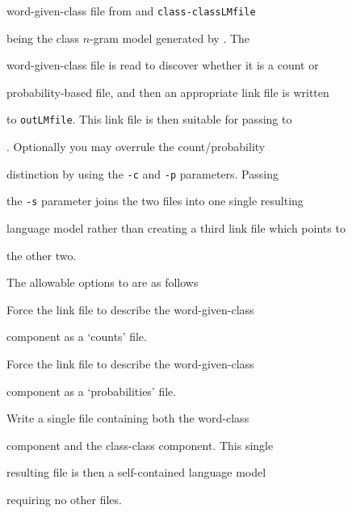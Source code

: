 word-given-class file from  and {\tt class-classLMfile}


being the class $n$-gram model generated by .  The


word-given-class file is read to discover whether it is a count or


probability-based file, and then an appropriate link file is written


to {\tt outLMfile}.  This link file is then suitable for passing to


.  Optionally you may overrule the count/probability


distinction by using the {\tt -c} and {\tt -p} parameters.  Passing


the {\tt -s} parameter joins the two files into one single resulting


language model rather than creating a third link file which points to


the other two.





The allowable options to  are as follows


\begin{optlist}


   Force the link file to describe the word-given-class


        component as a `counts' file.





   Force the link file to describe the word-given-class


        component as a `probabilities' file.





   Write a single file containing both the word-class


        component and the class-class component.  This single


        resulting file is then a self-contained language model


        requiring no other files.





\end{optlist}












